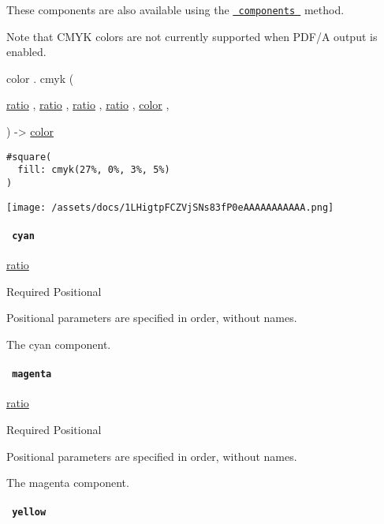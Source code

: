 These components are also available using the
\href{/docs/reference/visualize/color/\#definitions-components}{\texttt{\ components\ }}
method.

Note that CMYK colors are not currently supported when PDF/A output is
enabled.

color { . } { cmyk } (

{ \href{/docs/reference/layout/ratio/}{ratio} , } {
\href{/docs/reference/layout/ratio/}{ratio} , } {
\href{/docs/reference/layout/ratio/}{ratio} , } {
\href{/docs/reference/layout/ratio/}{ratio} , } {
\href{/docs/reference/visualize/color/}{color} , }

) -\textgreater{} \href{/docs/reference/visualize/color/}{color}

\begin{verbatim}
#square(
  fill: cmyk(27%, 0%, 3%, 5%)
)
\end{verbatim}

\texttt{[image: /assets/docs/1LHigtpFCZVjSNs83fP0eAAAAAAAAAAA.png]}

\paragraph{\texorpdfstring{\texttt{\ cyan\ }}{ cyan }}\label{definitions-cmyk-cyan}

\href{/docs/reference/layout/ratio/}{ratio}

{Required} {{ Positional }}

\label{definitions-cmyk-cyan-positional-tooltip}
Positional parameters are specified in order, without names.

The cyan component.

\paragraph{\texorpdfstring{\texttt{\ magenta\ }}{ magenta }}\label{definitions-cmyk-magenta}

\href{/docs/reference/layout/ratio/}{ratio}

{Required} {{ Positional }}

\label{definitions-cmyk-magenta-positional-tooltip}
Positional parameters are specified in order, without names.

The magenta component.

\paragraph{\texorpdfstring{\texttt{\ yellow\ }}{ yellow }}\label{definitions-cmyk-yellow}

